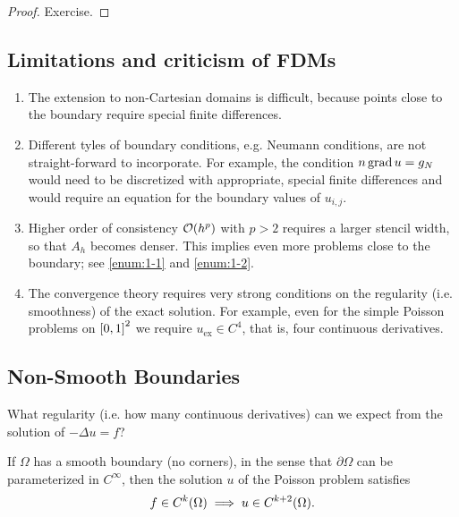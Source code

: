 \begin{proof}
	Exercise.
\end{proof}


\subsection{Limitations and criticism of FDMs}

\begin{enumerate}
	\item\label{enum:1-1} The extension to non-Cartesian domains is difficult, because points close to the boundary require special finite differences.
	\item\label{enum:1-2} Different tyles of boundary conditions, e.g. Neumann conditions, are not straight-forward to incorporate.
	For example, the condition \(n\grad u = g_N\) would need to be discretized with appropriate, special finite differences and would require an equation for the boundary values of \(u_{i, j}\).
	\item Higher order of consistency \(\mathcal{O}\parentheses*{h^p}\) with \(p > 2\) requires a larger stencil width, so that \(A_h\) becomes denser.
	This implies even more problems close to the boundary; see \ref{enum:1-1} and \ref{enum:1-2}.
	\item The convergence theory requires very strong conditions on the regularity (i.e. smoothness) of the exact solution.
	For example, even for the simple Poisson problems on \(\brackets*{0, 1}^2\) we require \(u_{\text{ex}} \in C^4\), that is, four continuous derivatives.
\end{enumerate}


\subsection{Non-Smooth Boundaries}

What regularity (i.e. how many continuous derivatives) can we expect from the solution of \(-\Delta u = f\)?

\begin{theorem}
	If \(\Omega\) has a smooth boundary (no corners), in the sense that \(\partial\Omega\) can be parameterized in \(C^\infty\), then the solution \(u\) of the Poisson problem satisfies
	\[
		f \in C^k\parentheses*{\Omega} \implies u \in C^{k + 2}\parentheses*{\Omega}.
	\]
\end{theorem}

